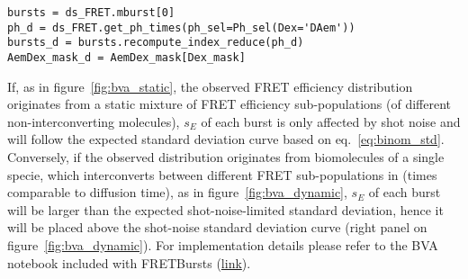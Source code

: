 \begin{lstlisting}
bursts = ds_FRET.mburst[0]
ph_d = ds_FRET.get_ph_times(ph_sel=Ph_sel(Dex='DAem'))
bursts_d = bursts.recompute_index_reduce(ph_d)
AemDex_mask_d = AemDex_mask[Dex_mask]
\end{lstlisting}



If, as in figure~\ref{fig:bva_static}, the observed FRET efficiency distribution 
originates from a static mixture of FRET efficiency sub-populations (of different 
non-interconverting molecules), 
$s_E$ of each burst is only affected by shot noise and will follow the expected standard deviation curve based on eq.~\ref{eq:binom_std}. 
Conversely, if the observed distribution originates from biomolecules of a single specie, which 
interconverts between different FRET sub-populations in (times comparable to diffusion 
time), as in figure~\ref{fig:bva_dynamic}, $s_E$ of each burst will be larger than the expected 
shot-noise-limited standard deviation, hence it will be placed above the shot-noise standard 
deviation curve (right panel on figure~\ref{fig:bva_dynamic}).
For implementation details please refer to the BVA notebook included with FRETBursts
(\href{http://nbviewer.jupyter.org/github/tritemio/FRETBursts_notebooks/blob/master/notebooks/Example%20-%20Burst%20Variance%20Analysis.ipynb}{link}).
